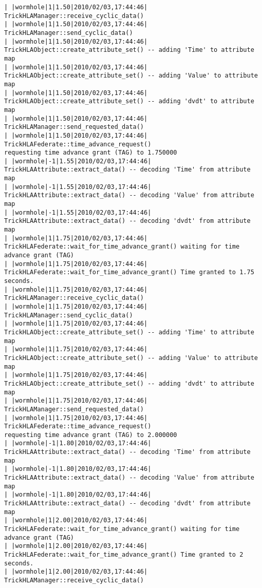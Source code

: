 \begin{lstlisting}[numbers=none,caption={output showing conditionally sent cyclic data}]
| |wormhole|1|1.50|2010/02/03,17:44:46| TrickHLAManager::receive_cyclic_data()
| |wormhole|1|1.50|2010/02/03,17:44:46| TrickHLAManager::send_cyclic_data()
| |wormhole|1|1.50|2010/02/03,17:44:46| TrickHLAObject::create_attribute_set() -- adding 'Time' to attribute map
| |wormhole|1|1.50|2010/02/03,17:44:46| TrickHLAObject::create_attribute_set() -- adding 'Value' to attribute map
| |wormhole|1|1.50|2010/02/03,17:44:46| TrickHLAObject::create_attribute_set() -- adding 'dvdt' to attribute map
| |wormhole|1|1.50|2010/02/03,17:44:46| TrickHLAManager::send_requested_data()
| |wormhole|1|1.50|2010/02/03,17:44:46| TrickHLAFederate::time_advance_request()   
requesting time advance grant (TAG) to 1.750000
| |wormhole|-1|1.55|2010/02/03,17:44:46| TrickHLAAttribute::extract_data() -- decoding 'Time' from attribute map
| |wormhole|-1|1.55|2010/02/03,17:44:46| TrickHLAAttribute::extract_data() -- decoding 'Value' from attribute map
| |wormhole|-1|1.55|2010/02/03,17:44:46| TrickHLAAttribute::extract_data() -- decoding 'dvdt' from attribute map
| |wormhole|1|1.75|2010/02/03,17:44:46| TrickHLAFederate::wait_for_time_advance_grant() waiting for time advance grant (TAG)
| |wormhole|1|1.75|2010/02/03,17:44:46| TrickHLAFederate::wait_for_time_advance_grant() Time granted to 1.75 seconds.
| |wormhole|1|1.75|2010/02/03,17:44:46| TrickHLAManager::receive_cyclic_data()
| |wormhole|1|1.75|2010/02/03,17:44:46| TrickHLAManager::send_cyclic_data()
| |wormhole|1|1.75|2010/02/03,17:44:46| TrickHLAObject::create_attribute_set() -- adding 'Time' to attribute map
| |wormhole|1|1.75|2010/02/03,17:44:46| TrickHLAObject::create_attribute_set() -- adding 'Value' to attribute map
| |wormhole|1|1.75|2010/02/03,17:44:46| TrickHLAObject::create_attribute_set() -- adding 'dvdt' to attribute map
| |wormhole|1|1.75|2010/02/03,17:44:46| TrickHLAManager::send_requested_data()
| |wormhole|1|1.75|2010/02/03,17:44:46| TrickHLAFederate::time_advance_request()   
requesting time advance grant (TAG) to 2.000000
| |wormhole|-1|1.80|2010/02/03,17:44:46| TrickHLAAttribute::extract_data() -- decoding 'Time' from attribute map
| |wormhole|-1|1.80|2010/02/03,17:44:46| TrickHLAAttribute::extract_data() -- decoding 'Value' from attribute map
| |wormhole|-1|1.80|2010/02/03,17:44:46| TrickHLAAttribute::extract_data() -- decoding 'dvdt' from attribute map
| |wormhole|1|2.00|2010/02/03,17:44:46| TrickHLAFederate::wait_for_time_advance_grant() waiting for time advance grant (TAG)
| |wormhole|1|2.00|2010/02/03,17:44:46| TrickHLAFederate::wait_for_time_advance_grant() Time granted to 2 seconds.
| |wormhole|1|2.00|2010/02/03,17:44:46| TrickHLAManager::receive_cyclic_data()

\end{lstlisting}
